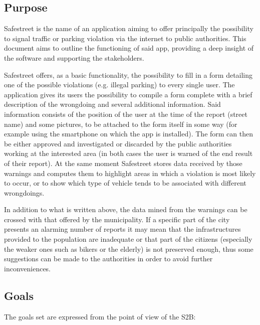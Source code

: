 \subsection{Purpose}

Safestreet is the name of an application aiming to offer principally the possibility to signal traffic or parking violation via the internet to public authorities.
This document aims to outline the functioning of said app, providing a deep insight of the software and supporting the stakeholders.

Safestreet offers, as a basic functionality, the possibility to fill in a form detailing one of the possible violations (e.g. illegal parking) to every single user. The application gives its users the possibility to compile a form complete with a brief description of the wrongdoing and several additional information. Said information consists of the position of the user at the time of the report (street name) and some pictures, to be attached to the form itself in some way (for example using the smartphone on which the app is installed). The form can then be either approved and investigated or discarded by the public authorities working at the interested area (in both cases the user is warned of the end result of their report). At the same moment Safestreet stores data received by those warnings and computes them to highlight areas in which a violation is most likely to occur, or to show which type of vehicle tends to be associated with different wrongdoings.

In addition to what is written above, the data mined from the warnings can be crossed with that offered by the municipality. If a specific part of the city presents an alarming number of reports it may mean that the infrastructures provided to the population are inadequate or that part of the citizens (especially the weaker ones such as bikers or the elderly) is not preserved enough, thus some suggestions can be made to the authorities in order to avoid further inconveniences.

\subsection{Goals}

The goals set are expressed from the point of view of the S2B:

